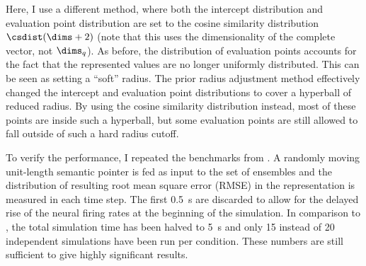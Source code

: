 Here, I use a different method, where both the intercept distribution and evaluation point distribution are set to the cosine similarity distribution $\csdist(\dims + 2)$ (note that this uses the dimensionality of the complete vector, not $\dims_q$).
As before, the distribution of evaluation points accounts for the fact that the represented values are no longer uniformly distributed.
This can be seen as setting a ``soft'' radius.
The prior radius adjustment method effectively changed the intercept and evaluation point distributions to cover a hyperball of reduced radius.
By using the cosine similarity distribution instead, most of these points are inside such a hyperball, but some evaluation points are still allowed to fall outside of such a hard radius cutoff.

To verify the performance, I repeated the benchmarks from \textcite{gosmann216}\@.
A randomly moving unit-length semantic pointer is fed as input to the set of ensembles and the distribution of resulting root mean square error (RMSE) in the representation is measured in each time step.
The first \SI{0.5}{\second} are discarded to allow for the delayed rise of the neural firing rates at the beginning of the simulation.
In comparison to \textcite{gosmann216}, the total simulation time has been halved to \SI{5}{\second} and only \num{15} instead of \num{20} independent simulations have been run per condition.
These numbers are still sufficient to give highly significant results.

